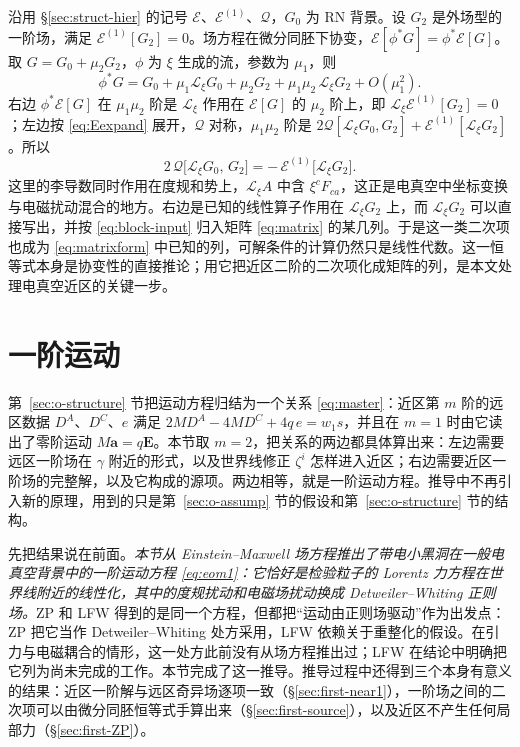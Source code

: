 \documentclass[11pt,a4paper]{ctexart}
\begin{document}
沿用 \S\ref{sec:struct-hier} 的记号 $\mathcal E$、$\mathcal E^{(1)}$、$\mathcal Q$，$G_0$ 为 RN 背景。设 $G_2$ 是外场型的一阶场，满足 $\mathcal E^{(1)}[G_2]=0$。场方程在微分同胚下协变，$\mathcal E[\phi^*G]=\phi^*\mathcal E[G]$。取 $G=G_0+\mu_2G_2$，$\phi$ 为 $\xi$ 生成的流，参数为 $\mu_1$，则
\begin{equation*}
\phi^*G=G_0+\mu_1\mathcal L_\xi G_0+\mu_2G_2+\mu_1\mu_2\,\mathcal L_\xi G_2+O(\mu_1^2).
\end{equation*}
右边 $\phi^*\mathcal E[G]$ 在 $\mu_1\mu_2$ 阶是 $\mathcal L_\xi$ 作用在 $\mathcal E[G]$ 的 $\mu_2$ 阶上，即 $\mathcal L_\xi\mathcal E^{(1)}[G_2]=0$；左边按 \eqref{eq:Eexpand} 展开，$\mathcal Q$ 对称，$\mu_1\mu_2$ 阶是 $2\mathcal Q[\mathcal L_\xi G_0,G_2]+\mathcal E^{(1)}[\mathcal L_\xi G_2]$。所以
\begin{equation}
2\,\mathcal Q\big[\mathcal L_\xi G_0,\,G_2\big]=-\,\mathcal E^{(1)}\big[\mathcal L_\xi G_2\big].
\label{eq:Qident}
\end{equation}
这里的李导数同时作用在度规和势上，$\mathcal L_\xi A$ 中含 $\xi^cF_{ca}$，这正是电真空中坐标变换与电磁扰动混合的地方。右边是已知的线性算子作用在 $\mathcal L_\xi G_2$ 上，而 $\mathcal L_\xi G_2$ 可以直接写出，并按 \eqref{eq:block-input} 归入矩阵 \eqref{eq:matrix} 的某几列。于是这一类二次项也成为 \eqref{eq:matrixform} 中已知的列，可解条件的计算仍然只是线性代数。这一恒等式本身是协变性的直接推论；用它把近区二阶的二次项化成矩阵的列，是本文处理电真空近区的关键一步。

\section{一阶运动}\label{sec:o-first}

第~\ref{sec:o-structure} 节把运动方程归结为一个关系 \eqref{eq:master}：近区第 $m$ 阶的远区数据 $D^A$、$D^C$、$e$ 满足 $2MD^A-4MD^C+4q\,e=w_1s$，并且在 $m=1$ 时由它读出了零阶运动 $M\boldsymbol a=q\boldsymbol E$。本节取 $m=2$，把关系的两边都具体算出来：左边需要远区一阶场在 $\gamma$ 附近的形式，以及世界线修正 $\zeta^i$ 怎样进入近区；右边需要近区一阶场的完整解，以及它构成的源项。两边相等，就是一阶运动方程。推导中不再引入新的原理，用到的只是第~\ref{sec:o-assump} 节的假设和第~\ref{sec:o-structure} 节的结构。

先把结果说在前面。\emph{本节从 Einstein--Maxwell 场方程推出了带电小黑洞在一般电真空背景中的一阶运动方程 \eqref{eq:eom1}：它恰好是检验粒子的 Lorentz 力方程在世界线附近的线性化，其中的度规扰动和电磁场扰动换成 Detweiler--Whiting 正则场。}ZP 和 LFW 得到的是同一个方程，但都把“运动由正则场驱动”作为出发点：ZP 把它当作 Detweiler--Whiting 处方采用，LFW 依赖关于重整化的假设。在引力与电磁耦合的情形，这一处方此前没有从场方程推出过；LFW 在结论中明确把它列为尚未完成的工作。本节完成了这一推导。推导过程中还得到三个本身有意义的结果：近区一阶解与远区奇异场逐项一致（\S\ref{sec:first-near1}），一阶场之间的二次项可以由微分同胚恒等式手算出来（\S\ref{sec:first-source}），以及近区不产生任何局部力（\S\ref{sec:first-ZP}）。
\end{document}
